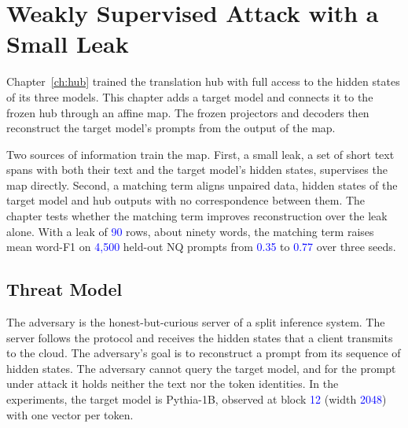 \providecommand{\vf}[1]{\textcolor{blue}{#1}}
\providecommand{\hit}[1]{\textcolor[RGB]{0,115,90}{#1}}
\providecommand{\miss}[1]{\textcolor[RGB]{196,78,0}{\textbf{#1}}}

\chapter{Weakly Supervised Attack with a Small Leak}\label{ch:attack}

Chapter~\ref{ch:hub} trained the translation hub with full access to the hidden states of its three models.
This chapter adds a target model and connects it to the frozen hub through an affine map.
The frozen projectors and decoders then reconstruct the target model's prompts from the output of the map.

Two sources of information train the map.
First, a small leak, a set of short text spans with both their text and the target model's hidden states, supervises the map directly.
Second, a matching term aligns unpaired data, hidden states of the target model and hub outputs with no correspondence between them.
The chapter tests whether the matching term improves reconstruction over the leak alone.
With a leak of \vf{90} rows, about ninety words, the matching term raises mean word-F1 on \vf{4{,}500} held-out NQ prompts from \vf{0.35} to \vf{0.77} over three seeds. %

\section{Threat Model}\label{sec:attack:threat}

The adversary is the honest-but-curious server of a split inference system.
The server follows the protocol and receives the hidden states that a client transmits to the cloud.
The adversary's goal is to reconstruct a prompt from its sequence of hidden states.
The adversary cannot query the target model, and for the prompt under attack it holds neither the text nor the token identities.
In the experiments, the target model is Pythia-1B, observed at block \vf{12} (width \vf{2048}) with one vector per token. %

